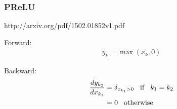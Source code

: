 \subsubsection{PReLU}

http://arxiv.org/pdf/1502.01852v1.pdf




\noindent
Forward:
\begin{align}
 y_k = \max(x_k, 0) \nonumber
\end{align}

\noindent
Backward:
\begin{align}
 \frac{dy_{k_2}}{dx_{k_1}} &= \delta_{x_{k_1}>0} \hspace{0.3cm} \text{if} \hspace{0.3cm} k_1=k_2 \nonumber \\
                           &= 0 \hspace{0.3cm} \text{otherwise} \nonumber
\end{align}





